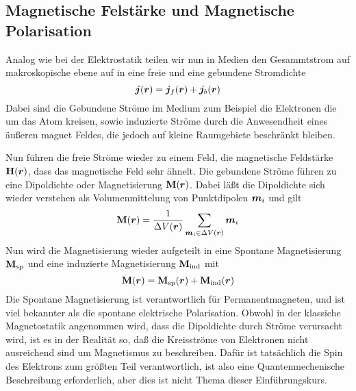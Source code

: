 
\subsection{Magnetische Felstärke und Magnetische Polarisation}%
\label{sub:H-und-M}

Analog wie bei der Elektrostatik teilen wir nun in Medien den Gesammtstrom auf makroskopische ebene auf in eine freie und eine gebundene Stromdichte
\begin{equation}
  \vb*j(\vb*r) = \vb*j_f(\vb*r) + \vb*j_b(\vb*r)
\end{equation}
Dabei sind die Gebundene Ströme im Medium zum Beispiel die Elektronen die um
das Atom kreisen, sowie induzierte Ströme durch die Anwesendheit eines äußeren magnet Feldes, die jedoch auf kleine Raumgebiete beschränkt bleiben.

Nun führen die freie Ströme wieder zu einem Feld, die magnetische Feldstärke $\vb H(\vb*r)$, dass das magnetische Feld sehr ähnelt. Die gebundene Ströme führen zu eine Dipoldichte oder Magnetisierung $\vb M(\vb*r)$. Dabei läßt die Dipoldichte sich wieder verstehen als Volumenmittelung von Punktdipolen $\vb*m_i$ und gilt
\begin{equation}
  \vb M(\vb*r) = \frac{1}{\Delta V(\vb*r)} \sum_{\vb*m_i\in\Delta V(\vb*r)}\vb*m_i
\end{equation}
Nun wird die Magnetisierung wieder aufgeteilt in eine Spontane Magnetisierung $\vb M_{\text{sp}}$ und eine induzierte
Magnetisierung $\vb M_{\text{ind}}$ mit
\begin{equation}
  \vb M(\vb*r) = \vb M_\text{sp}(\vb*r) + \vb M_\text{ind}(\vb*r)
\end{equation}
Die Spontane Magnetisierung ist verantwortlich für Permanentmagneten, und ist viel bekannter als die spontane elektrische Polarisation. Obwohl in der klassiche Magnetostatik angenommen wird, dass die Dipoldichte durch Ströme verursacht wird, ist es in der Realität so, daß die Kreisströme von Elektronen
nicht ausreichend sind um Magnetismus zu beschreiben. Dafür ist tatsächlich die Spin des Elektrons zum größten Teil verantwortlich, ist also eine Quantenmechenische Beschreibung erforderlich, aber dies ist nicht Thema dieser Einführungskurs.

